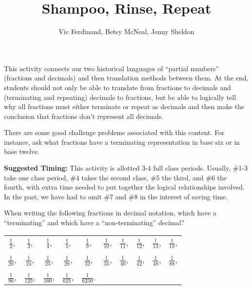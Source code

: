 \documentclass{ximera}
\title{Shampoo, Rinse, Repeat}
\author{Vic Ferdinand, Betsy McNeal, Jenny Sheldon}
\begin{document}
\begin{abstract} \end{abstract}
\maketitle

\begin{instructorIntro}
This activity connects our two historical languages of ``partial numbers'' (fractions and decimals) and then translation methods between them.  At the end, students should not only be able to translate from fractions to decimals and (terminating and repeating) decimals to fractions, but be able to logically tell why all fractions must either terminate or repeat as decimals and then make the conclusion that fractions don't represent all decimals.

There are some good challenge problems associated with this content.  For instance, ask what fractions have a terminating representation in base six or in base twelve.

{\bf Suggested Timing:} This activity is allotted 3-4 full class periods.  Usually, \#1-3 take one class period, \#4 takes the second class, \#5 the third, and \#6 the fourth, with extra time needed to put together the logical relationships involved.  In the past, we have had to omit \#7 and \#8 in the interest of saving time.  
\end{instructorIntro}

\begin{problem}

When writing the following fractions in decimal notation, which have a
``terminating'' and which have a ``non-terminating'' decimal?


\vspace*{0.5cm}

\begin{tabular}{c c c c c c c c c c}

$\displaystyle \frac{1}{2}$, & $\displaystyle \frac{1}{3}$, & $\displaystyle \frac{1}{4}$, & $\displaystyle \frac{1}{5}$, & $\displaystyle \frac{1}{9}$, & $\displaystyle \frac{1}{10}$, & $\displaystyle \frac{1}{11}$, & $\displaystyle \frac{1}{12}$, & $\displaystyle \frac{1}{13}$, & $\displaystyle \frac{1}{15}$,\\
\\
$\displaystyle \frac{1}{20}$, & $\displaystyle \frac{1}{24}$, & $\displaystyle \frac{1}{25}$, & $\displaystyle \frac{1}{28}$, & $\displaystyle \frac{1}{32}$, & $\displaystyle \frac{1}{35}$, & $\displaystyle \frac{1}{40}$, & $\displaystyle \frac{1}{42}$, & $\displaystyle \frac{1}{48}$, & $\displaystyle \frac{1}{88}$,\\
\\
$\displaystyle \frac{1}{96}$, & $\displaystyle \frac{1}{125}$, & $\displaystyle \frac{1}{160}$, & $\displaystyle \frac{1}{625}$, & $\displaystyle \frac{1}{6250}$.\\

\end{tabular}
\end{problem}
\end{document}
